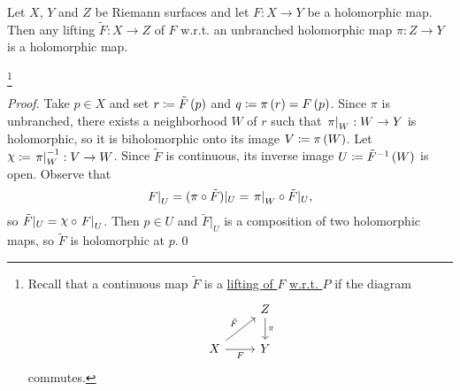 \documentclass[../Moduli_Spaces_of_Riemann_Surfaces.tex]{subfiles}
\begin{document}
    \begin{proposition}
        Let $X$, $Y$ and $Z$ be Riemann surfaces and let $F:X\to Y$ be a holomorphic map. Then any lifting $\tilde{F}:X\to Z$ of $F$ w.r.t. an unbranched holomorphic map $\pi:Z\to Y$ is a holomorphic map.
    \end{proposition}
    \footnote{Recall that a continuous map $\tilde{F}$ is a \ul{lifting of $F$} \ul{w.r.t. $P$} if the diagram
        \begin{equation*}
            \begin{tikzcd}[ampersand replacement=\&]
                \& Z \ar[d, "\pi"] \\
                X \ar[ur, "\tilde{F}"] \ar[r, "F"'] \& Y
            \end{tikzcd}
        \end{equation*}
        commutes.}
    \vspace{-0.1in}
    \begin{proof}
        Take $p\in X$ and set $r\coloneqq\tilde{F}\left(p\right)$ and $q\coloneqq\pi\left(r\right)=F\left(p\right)$. Since $\pi$ is unbranched, there exists a neighborhood $W$ of $r$ such that $\left.\pi\right|_W:W\to Y$ is holomorphic, so it is biholomorphic onto its image $V\coloneqq\pi\left(W\right)$. Let $\cchi\coloneqq\l.\pi\r|_W^{-1}:V\to W $. Since $\tilde{F}$ is continuous, its inverse image $U\coloneqq\tilde{F}^{-1}\left(W\right)$ is open. Observe that
        \begin{equation*}
            \left.F\right|_U=(\pi\circ\tilde{F})|_U=\left.\pi\right|_W\circ\tilde{F}|_U,
        \end{equation*}
        so $\tilde{F}|_U=\cchi\circ\l.F\r|_U$. Then $p\in U$ and $\tilde{F}|_U$ is a composition of two holomorphic maps, so $\tilde{F}$ is holomorphic at $p$.\qed
    \end{proof}
\end{document}
